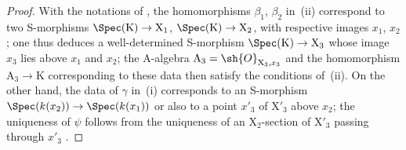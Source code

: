 \begin{proof}
With the notations of , the homomorphisms $\beta_1$, $\beta_2$ in~(ii) correspond to two S-morphisms $\Spec(\mathrm{K})\to\mathrm{X}_1$, $\Spec(\mathrm{K})\to\mathrm{X}_2$, with respective images $x_1$, $x_2$;
one thus deduces a well-determined S-morphism $\Spec(\mathrm{K})\to\mathrm{X}_3$  whose image $x_3$ lies above $x_1$ and $x_2$;
the A-algebra $\mathrm{A}_3=\sh{O}_{\mathrm{X}_3,x_3}$ and the homomorphism $\mathrm{A}_3\to\mathrm{K}$ corresponding to these data then satisfy the conditions of~(ii).
On the other hand, the data of $\gamma$ in~(i) corresponds to an S-morphism $\Spec(k(x_2))\to\Spec(k(x_1))$ or also to a point $x'_3$ of $\mathrm{X}'_3$ above $x_2$;
the uniqueness of $\psi$ follows from the uniqueness of an $\mathrm{X}_2$-section of $\mathrm{X}'_3$ passing through $x'_3$ .
\end{proof}

